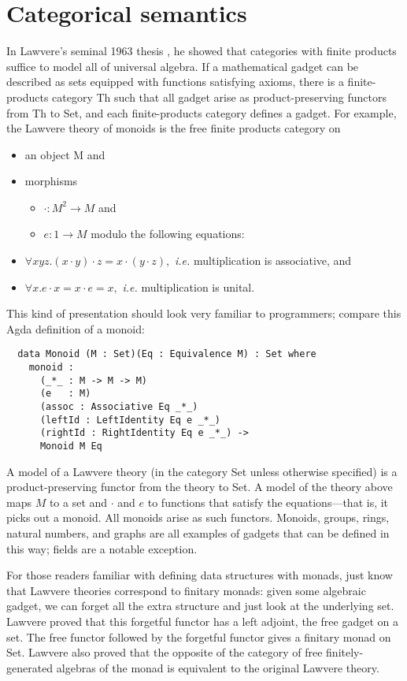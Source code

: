 \documentclass[a4paper,UKenglish]{article}
\newcommand{\maps}{\colon}
\begin{document}
\section{Categorical semantics}

In Lawvere's seminal 1963 thesis \cite{Lawvere}, he showed that categories with finite products suffice to model all of universal algebra.  If a mathematical gadget can be described as sets equipped with functions satisfying axioms, there is a finite-products category Th such that all gadget arise as product-preserving functors from Th to Set, and each finite-products category defines a gadget.  For example, the Lawvere theory of monoids is the free finite products category on
\begin{itemize}
  \item an object M and
  \item morphisms 
  \begin{itemize}
    \item $\cdot\maps M^2 \to M$ and
    \item $e\maps 1 \to M$ modulo the following equations:
  \end{itemize}
  \item $\forall xyz.(x\cdot y)\cdot z = x\cdot(y\cdot z),$ {\em i.e.} multiplication is associative, and
  \item $\forall x.e \cdot x = x\cdot e = x,$ {\em i.e.} multiplication is unital.
\end{itemize}
This kind of presentation should look very familiar to programmers; compare this Agda definition of a monoid:
\begin{verbatim}
  data Monoid (M : Set)(Eq : Equivalence M) : Set where
    monoid :
      (_*_ : M -> M -> M)
      (e   : M)
      (assoc : Associative Eq _*_)
      (leftId : LeftIdentity Eq e _*_)
      (rightId : RightIdentity Eq e _*_) ->
      Monoid M Eq
\end{verbatim}

A model of a Lawvere theory (in the category Set unless otherwise specified) is a product-preserving functor from the theory to Set.  A model of the theory above maps $M$ to a set and $\cdot$ and $e$ to functions that satisfy the equations---that is, it picks out a monoid.  All monoids arise as such functors. Monoids, groups, rings, natural numbers, and graphs are all examples of gadgets that can be defined in this way; fields are a notable exception.  

For those readers familiar with defining data structures with monads, just know that Lawvere theories correspond to finitary monads: given some algebraic gadget, we can forget all the extra structure and just look at the underlying set.  Lawvere proved that this forgetful functor has a left adjoint, the free gadget on a set.  The free functor followed by the forgetful functor gives a finitary monad on Set.  Lawvere also proved that the opposite of the category of free finitely-generated algebras of the monad is equivalent to the original Lawvere theory.
\end{document}
